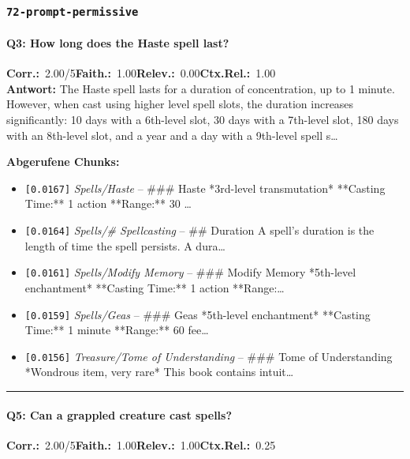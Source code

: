 \subsubsection*{\texttt{72-prompt-permissive}}
\label{app:samples:72_prompt_permissive}

\paragraph{Q3: How long does the Haste spell last?}
\noindent \textbf{Corr.:}~2.00/5\quad \textbf{Faith.:}~1.00\quad \textbf{Relev.:}~0.00\quad \textbf{Ctx.Rel.:}~1.00\\

\noindent\textbf{Antwort:} The Haste spell lasts for a duration of concentration, up to 1 minute. However, when cast using higher level spell slots, the duration increases significantly: 10 days with a 6th-level slot, 30 days with a 7th-level slot, 180 days with an 8th-level slot, and a year and a day with a 9th-level spell s\ldots

\noindent\textbf{Abgerufene Chunks:}
\begin{itemize}[noitemsep, topsep=2pt]
  \item[\textbf{\#1}] \texttt{[0.0167]} \textit{Spells/Haste} -- \#\#\# Haste  *3rd-level transmutation*  **Casting Time:** 1 action  **Range:** 30 \ldots
  \item[\textbf{\#2}] \texttt{[0.0164]} \textit{Spells/# Spellcasting} -- \#\# Duration  A spell's duration is the length of time the spell persists. A dura\ldots
  \item[\textbf{\#3}] \texttt{[0.0161]} \textit{Spells/Modify Memory} -- \#\#\# Modify Memory  *5th-level enchantment*  **Casting Time:** 1 action  **Range:\ldots
  \item[\textbf{\#4}] \texttt{[0.0159]} \textit{Spells/Geas} -- \#\#\# Geas  *5th-level enchantment*  **Casting Time:** 1 minute  **Range:** 60 fee\ldots
  \item[\textbf{\#5}] \texttt{[0.0156]} \textit{Treasure/Tome of Understanding} -- \#\#\# Tome of Understanding  *Wondrous item, very rare*  This book contains intuit\ldots
\end{itemize}
\vspace{4pt}
\hrule
\vspace{6pt}

\paragraph{Q5: Can a grappled creature cast spells?}
\noindent \textbf{Corr.:}~2.00/5\quad \textbf{Faith.:}~1.00\quad \textbf{Relev.:}~1.00\quad \textbf{Ctx.Rel.:}~0.25\\

